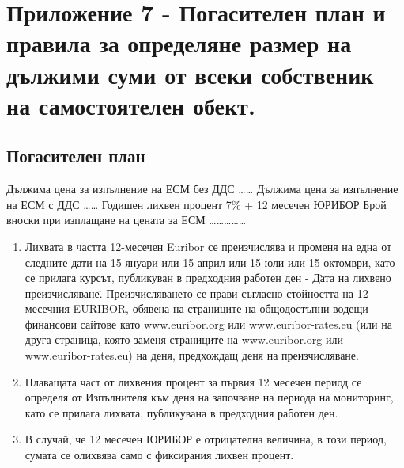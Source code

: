 \section{Приложение 7 {-} Погасителен план и правила за определяне размер на дължими суми от всеки собственик на самостоятелен обект.}

\subsection{Погасителен план}

Дължима цена за изпълнение на ЕСМ без ДДС
……
Дължима цена за изпълнение на ЕСМ с ДДС
……
Годишен лихвен процент
7\% + 12 месечен ЮРИБОР
Брой вноски при изплащане на цената за ЕСМ
……………


\begin{center}
\end{center}

\begin{enumerate}
\item Лихвата в частта 12-месечен Euribor се преизчислява и променя на
  една от следните дати на 15 януари или 15 април или 15 юли или 15
  октомври, като се прилага курсът, публикуван в предходния работен
  ден {-} \"Дата на лихвено преизчисляване\". Преизчисляването се прави
  съгласно стойността на 12-месечния EURIBOR, обявена на страниците на
  общодостъпни водещи финансови сайтове като www.euribor.org или
  www.euribor-rates.eu (или на друга страница, която заменя страниците
  на www.euribor.org или www.euribor-rates.eu) на деня, предхождащ
  деня на преизчисляване.
\item Плаващата част от лихвения процент за първия 12 месечен период
  се определя от Изпълнителя към деня на започване на периода на
  мониторинг, като се прилага лихвата, публикувана в предходния
  работен ден.
\item В случай, че 12 месечен ЮРИБОР е отрицателна величина, в този
  период, сумата се олихвява само с фиксирания лихвен процент.
\end{enumerate}
